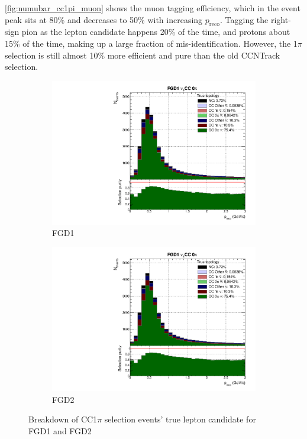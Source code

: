 \autoref{fig:numubar_cc1pi_muon} shows the muon tagging efficiency, which in the event peak sits at 80\% and decreases to 50\% with increasing $p_{\text{reco}}$. Tagging the right-sign pion as the lepton candidate happens 20\% of the time, and protons about 15\% of the time, making up a large fraction of mis-identification. However, the 1$\pi$ selection is still almost 10\% more efficient and pure than the old CCNTrack selection.
\begin{figure}[h]
	\begin{subfigure}[t]{0.49\textwidth}
		\includegraphics[width=\textwidth,page=16, trim={0mm 0mm 0mm 9mm}, clip]{figures/mach3/2018/Selection/2018_FullNoRedNDmatrix_rebin_verbose_may_diagnostics}
		\caption{FGD1}
	\end{subfigure}
	\begin{subfigure}[t]{0.49\textwidth}
		\includegraphics[width=\textwidth,page=22, trim={0mm 0mm 0mm 9mm}, clip]{figures/mach3/2018/Selection/2018_FullNoRedNDmatrix_rebin_verbose_may_diagnostics}
		\caption{FGD2}
	\end{subfigure}
	\caption{Breakdown of \numubar CC1$\pi$ selection events' true lepton candidate for FGD1 and FGD2}
	\label{fig:numubar_cc1pi_muon}
\end{figure}

